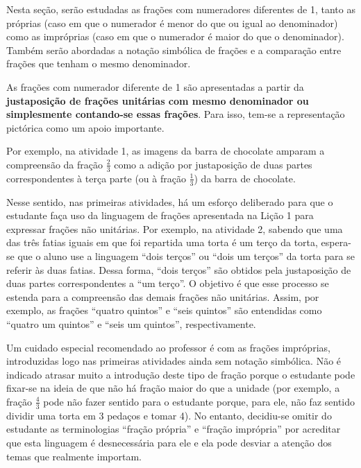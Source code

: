 
\noindent {\color{special}{\Large \bf Para o professor}}
\vspace{.5cm}

Nesta seção, serão estudadas as frações com numeradores diferentes de 1, tanto as próprias (caso em que o numerador é menor do que ou igual ao denominador) como as impróprias (caso em que o numerador é maior do que o denominador).
Também serão abordadas a notação simbólica de frações e a comparação entre frações que tenham o mesmo denominador. 

As frações com numerador diferente de 1 são apresentadas a partir da {\bf justaposição de frações unitárias com mesmo denominador ou simplesmente contando-se essas frações}. Para isso, tem-se a representação pictórica como um apoio importante. 

Por exemplo, na atividade 1, as imagens da barra de chocolate amparam a compreensão da fração $\frac{2}{3}$ como a adição por justaposição de duas partes correspondentes à terça parte (ou à fração $\frac{1}{3}$) da barra de chocolate.

Nesse sentido, nas primeiras atividades, há um esforço deliberado para que o estudante faça uso da linguagem de frações apresentada na Lição 1 para expressar frações não unitárias. Por exemplo, na atividade 2, sabendo que uma das três fatias iguais em que foi repartida uma torta é um terço da torta, espera-se que o aluno use a linguagem ``dois terços'' ou ``dois um terços'' da torta para se referir às duas fatias. Dessa forma, ``dois terços'' são obtidos pela justaposição de duas partes correspondentes a ``um terço''. O objetivo é que esse processo se estenda para a compreensão das demais frações não unitárias. Assim, por exemplo, as frações ``quatro quintos'' e ``seis quintos'' são entendidas como ``quatro um quintos'' e ``seis um quintos'', respectivamente.

Um cuidado especial recomendado ao professor é com as frações impróprias, introduzidas logo nas primeiras atividades ainda sem notação simbólica. Não é indicado atrasar muito a introdução deste tipo de fração porque o estudante pode fixar-se na ideia de que não há fração maior do que a unidade  (por exemplo, a fração $\frac{4}{3}$ pode não fazer sentido para o estudante porque, para ele, não faz sentido dividir uma torta em 3 pedaços e tomar 4). No entanto, decidiu-se omitir do estudante as terminologias ``fração própria'' e ``fração imprópria'' por acreditar que esta linguagem é desnecessária para ele e ela pode desviar a atenção dos temas que realmente importam.

